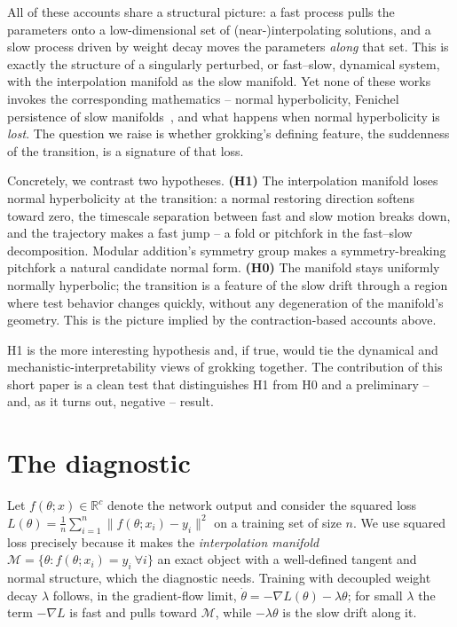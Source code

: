 \documentclass[11pt]{article}
\newcommand{\R}{\mathbb{R}}
\begin{document}
All of these accounts share a structural picture: a fast process pulls the
parameters onto a low-dimensional set of (near-)interpolating solutions, and a
slow process driven by weight decay moves the parameters \emph{along} that
set. This is exactly the structure of a singularly perturbed, or fast--slow,
dynamical system, with the interpolation manifold as the slow manifold. Yet
none of these works invokes the corresponding mathematics -- normal
hyperbolicity, Fenichel persistence of slow manifolds~\cite{fenichel1979,
kuehn2015}, and what happens when normal hyperbolicity is \emph{lost}. The
question we raise is whether grokking's defining feature, the suddenness of
the transition, is a signature of that loss.

Concretely, we contrast two hypotheses.
\textbf{(H1)} The interpolation manifold loses normal hyperbolicity at the
transition: a normal restoring direction softens toward zero, the
timescale separation between fast and slow motion breaks down, and the
trajectory makes a fast jump -- a fold or pitchfork in the fast--slow
decomposition. Modular addition's symmetry group makes a symmetry-breaking
pitchfork a natural candidate normal form.
\textbf{(H0)} The manifold stays uniformly normally hyperbolic; the transition
is a feature of the slow drift through a region where test behavior changes
quickly, without any degeneration of the manifold's geometry. This is the
picture implied by the contraction-based accounts above.

H1 is the more interesting hypothesis and, if true, would tie the dynamical
and mechanistic-interpretability views of grokking together. The contribution
of this short paper is a clean test that distinguishes H1 from H0 and a
preliminary -- and, as it turns out, negative -- result.

\section{The diagnostic}
Let $f(\theta;x)\in\R^{c}$ denote the network output and consider the squared
loss $L(\theta)=\frac1n\sum_{i=1}^{n}\lVert f(\theta;x_i)-y_i\rVert^2$ on a
training set of size $n$. We use squared loss precisely because it makes the
\emph{interpolation manifold} $\mathcal{M}=\{\theta : f(\theta;x_i)=y_i\ \forall i\}$
an exact object with a well-defined tangent and normal structure, which the
diagnostic needs. Training with decoupled weight decay $\lambda$ follows, in
the gradient-flow limit, $\dot\theta=-\nabla L(\theta)-\lambda\theta$; for
small $\lambda$ the term $-\nabla L$ is fast and pulls toward $\mathcal{M}$,
while $-\lambda\theta$ is the slow drift along it.
\end{document}
